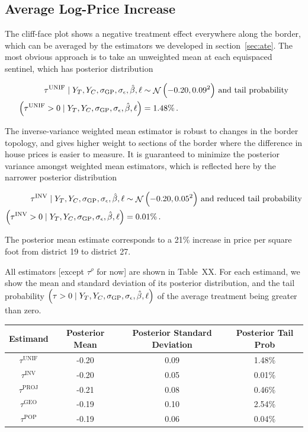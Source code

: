 \documentclass[letter]{article}
\let\Pr\relax
\DeclareMathOperator{\Pr}{\mathbb{P}}
\DeclareMathOperator{\normal}{\mathcal{N}}
\newcommand{\sigmaf}{\sigma_{\mathrm{GP}}}
\newcommand{\sigman}{\sigma_{\epsilon}}
\newcommand{\unifavg}{\tau^{\mathrm{UNIF}}}
\newcommand{\invvar}{\tau^{\mathrm{INV}}}
\newcommand{\taurho}{\tau^{\rho}}
\newcommand{\tauproj}{\tau^{\mathrm{PROJ}}}
\newcommand{\taugeo}{\tau^{\mathrm{GEO}}}
\newcommand{\taupop}{\tau^{\mathrm{POP}}}
\begin{document}
    	\subsection{Average Log-Price Increase}\label{average-log-price-increase}

The cliff-face plot shows a negative treatment effect everywhere along the border, which can be averaged by the estimators we developed in section~\ref{sec:ate}. The most obvious approach is to take an unweighted mean at each equispaced sentinel, which has posterior distribution

\begin{equation}
\begin{split}
    \unifavg \mid Y_T, Y_C, \sigmaf, \sigman, \hat{\beta}, \ell &\sim \normal\del{-0.20, 0.09^2}\,\text{and tail probability} \\
    \Pr\del{\unifavg > 0 \mid Y_T, Y_C, \sigmaf, \sigman, \hat{\beta}, \ell} &= 1.48\% \,.
\end{split}
\end{equation}

The inverse-variance weighted mean estimator is robust to changes in the border topology, and gives higher weight to sections of the border where the difference in house prices is easier to measure. It is guaranteed to minimize the posterior variance amongst weighted mean estimators, which is reflected here by the narrower posterior distribution

\begin{equation}
\begin{split}
    \invvar \mid Y_T, Y_C, \sigmaf, \sigman, \hat{\beta}, \ell &\sim \normal\del{-0.20, 0.05^2}\,\text{and reduced tail probability} \\
    \Pr\del{\invvar > 0 \mid Y_T, Y_C, \sigmaf, \sigman, \hat{\beta}, \ell} &= 0.01\% \,.
\end{split}
\end{equation}

The posterior mean estimate corresponds to a 21\% increase in price per square foot from district 19 to district 27.

All estimators {[}except \(\taurho\) for now{]} are shown in Table~XX. For each estimand, we show the mean and standard deviation of its posterior distribution, and the tail probability \(\Pr\del{\tau > 0 \mid Y_T, Y_C, \sigmaf, \sigman, \hat{\beta}, \ell}\) of the average treatment being greater than zero.
    


    	\begin{longtable}[]{@{}cccc@{}}
\toprule
Estimand & Posterior Mean & Posterior Standard Deviation & Posterior Tail Prob\tabularnewline
\midrule
\endhead
\(\unifavg\) & -0.20 & 0.09 & 1.48\%\tabularnewline
\(\invvar\) & -0.20 & 0.05 & 0.01\%\tabularnewline
\(\tauproj\) & -0.21 & 0.08 & 0.46\%\tabularnewline
\(\taugeo\) & -0.19 & 0.10 & 2.54\%\tabularnewline
\(\taupop\) & -0.19 & 0.06 & 0.04\%\tabularnewline
\bottomrule
\end{longtable}
    
\end{document}
